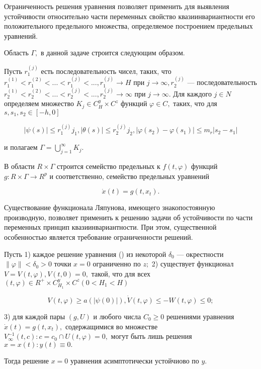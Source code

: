 	Ограниченность решения уравнения позволяет применить для выявления устойчивости относительно части переменных свойство квазиинвариантности его положительного предельного множества, определяемое построением предельных уравнений.
	
	Область $\Gamma, $ в данной задаче строится следующим образом. 
	
	Пусть ${r^{(j)}_1}$ есть последовательность чисел, таких, что $r^{(1)}_1 < r^{(2)}_1 < ... < r^{(j)}_1 < ..., r^{(j)}_1 \to H $ при $j \to \infty, {r^{(j)}_2}$ --- последовательность $r^{(1)}_2 < r^{(2)}_2 < ... < r^{(j)}_2 < ..., r^{(j)}_2 \to \infty $ при $j \to \infty.$ Для каждого $j \in N$ определяем множество $K_j \in C^y_H \times C^z$ функций $\varphi \in C,$ таких, что для $s, s_1, s_2 \in [-h, 0]$
		
		\begin{equation}
		| \psi(s) | \le r^{(j)}_1 j_1, | \theta (s) | \le r^{(j)}_2 j_2, | \varphi(s_2) - \varphi(s_1) | \le m_r | s_2 - s_1 | 
		\end{equation}
		
		и полагаем $ \Gamma = \bigcup\limits_{j=1}^{\infty } {K_j}.$
		
		В области $R \times \Gamma$ строится семейство предельных к $f(t, \varphi)$ функций $g : R \times \Gamma \to R^p$ и соответственно, семейство предельных уравнений
		
		\begin{equation}
		\dot x(t) = g(t, x_t).
		\end{equation}
		
		Существование функционала Ляпунова, имеющего знакопостоянную производную, позволяет применить к решению задачи об устойчивости по части переменных принцип квазиинвариантности. При этом, существенной особенностью является требование ограниченности решений.
		
		\begin{theorem}\label{t-1.11} Пусть 
			1) каждое решение уравнения () из некоторой $\delta_0$ --- окрестности $ \| \varphi \| < \delta_0 > 0$ точки $x = 0$ ограниченно по $z;$
			2) существует функционал $V = V(t, \varphi), V(t, 0) = 0,$ такой, что для всех $ (t, \varphi) \in R^+ \times C^y_{H_1} \times C^z (0 < H_1 < H)$
			
			\begin{equation}
			V(t, \varphi) \ge a(| \psi(0) |), \dot V (t, \varphi) \le - W(t, \varphi) \le 0;
			\end{equation}
			
			3) для каждой пары $ (g, U) $ и любого числа $C_0 \ge 0$ решениями уравнения $\dot x(t) = g(t, x_t), $ содержащимися во множестве ${V_{\infty}^{-1}(t, c) : c = c_0} \cap {U(t, \varphi) = 0}, $ могут быть лишь решения $x = x(t) : y(t) \equiv 0.$
			
			Тогда решение $x = 0$ уравнения асимптотически устойчиово по $y.$
			
		\end{theorem}
		
